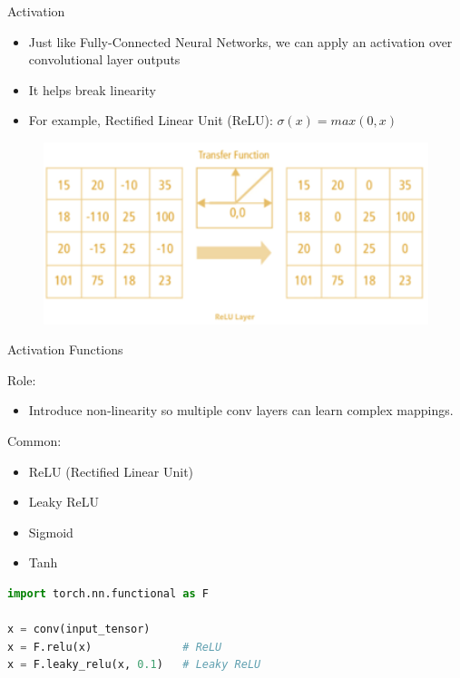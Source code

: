 \begin{frame}{Activation}

\begin{itemize}
    \item Just like Fully-Connected Neural Networks, we can apply an activation over convolutional layer outputs
    \item It helps break linearity
    \item For example, Rectified Linear Unit (ReLU): $\sigma(x) = max(0,x)$
\end{itemize}


\begin{figure}
\centering
\includegraphics[width=1.0\textwidth,height=0.6\textheight,keepaspectratio]{images/cnn/activation.png}
\end{figure}

\end{frame}

\begin{frame}[fragile]{Activation Functions}
\begin{block}{Role:}
    \begin{itemize}
        \item Introduce non‑linearity so multiple conv layers can learn complex mappings.
    \end{itemize}
\end{block}

\begin{block}{Common:}
    \begin{itemize}
        \item ReLU (Rectified Linear Unit)
        \item Leaky ReLU
        \item Sigmoid
        \item Tanh
    \end{itemize}
\end{block}

\begin{lstlisting}[language=Python, caption={Code snippet (PyTorch)}, basicstyle=\ttfamily\footnotesize]
import torch.nn.functional as F

x = conv(input_tensor)
x = F.relu(x)              # ReLU
x = F.leaky_relu(x, 0.1)   # Leaky ReLU
\end{lstlisting}
\end{frame}  

